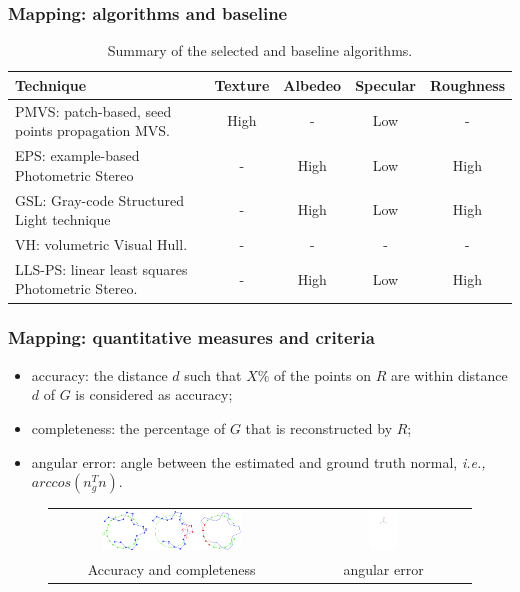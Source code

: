 \documentclass{beamer}
\begin{document}
\begin{frame}
\frametitle{Mapping: algorithms and baseline}

\begin{table}[!htbp]
\centering
\begin{tabular}{p{4cm}|c|c|c|c}
\toprule
Technique & Texture & Albedeo & Specular & Roughness\\
\midrule
PMVS: patch-based, seed points propagation MVS. & High & - & Low & -\\
\midrule
EPS: example-based Photometric Stereo & - & High & Low & High \\
\midrule
GSL: Gray-code Structured Light technique & - & High & Low & High\\
\midrule\midrule
VH: volumetric Visual Hull. & - & - & - & -\\
\midrule
LLS-PS: linear least squares Photometric Stereo. & - & High & Low & High\\
\bottomrule
\end{tabular}
\caption{Summary of the selected and baseline algorithms.}
\end{table}

\end{frame}

\begin{frame}
\frametitle{Mapping: quantitative measures and criteria}

\begin{itemize}
\item accuracy: the distance $d$ such that $X\%$ of the points on $R$ are within distance $d$ of $G$ is considered as accuracy;
\item completeness: the percentage of $G$ that is reconstructed by $R$;
\item angular error: angle between the estimated and ground truth normal, \textit{i.e.,} $arccos(n_g^T n)$.
\end{itemize}

\begin{figure}[!htbp]
\begin{tabular}{cc}
\includegraphics[width=0.6\textwidth]{mapping/qm_acc_cmp} &
\includegraphics[width=0.17\textwidth]{mapping/qm_ang_error}\\
Accuracy and completeness & angular error
\end{tabular}
\end{figure}

\end{frame}
\end{document}
